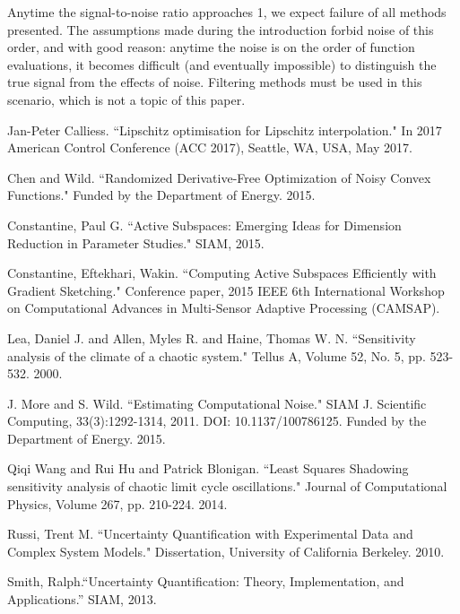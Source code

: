 \documentclass{amsart}
\begin{document}
Anytime the signal-to-noise ratio approaches 1, we expect failure of all methods presented. The assumptions made during the introduction forbid noise of this order, and with good reason: anytime the noise is on the order of function evaluations, it becomes difficult (and eventually impossible) to distinguish the true signal from the effects of noise. Filtering methods must be used in this scenario, which is not a topic of this paper.





\begin{thebibliography}{65}


 Jan-Peter Calliess. ``Lipschitz optimisation for Lipschitz interpolation." In 2017 American Control Conference (ACC 2017), Seattle, WA, USA, May 2017.

 Chen and Wild. ``Randomized Derivative-Free Optimization of Noisy Convex Functions." Funded by the Department of Energy. 2015.

 Constantine, Paul G. ``Active Subspaces: Emerging Ideas for Dimension Reduction in Parameter Studies." SIAM, 2015.

 Constantine, Eftekhari, Wakin. ``Computing Active Subspaces Efficiently with Gradient Sketching." Conference paper, 2015 IEEE 6th International Workshop on Computational Advances in Multi-Sensor Adaptive Processing (CAMSAP).


 Lea, Daniel J. and Allen, Myles R. and Haine, Thomas W. N. ``Sensitivity analysis of the climate of a chaotic system." Tellus A, Volume 52, No. 5, pp. 523-532. 2000.

 J. More and S. Wild. ``Estimating Computational Noise." SIAM J. Scientific Computing, 33(3):1292-1314, 2011. DOI: 10.1137/100786125. Funded by the Department of Energy. 2015.


 Qiqi Wang and Rui Hu and Patrick Blonigan. ``Least Squares Shadowing sensitivity analysis of chaotic limit cycle oscillations." Journal of Computational Physics, Volume 267, pp. 210-224. 2014.

 Russi, Trent M. ``Uncertainty Quantification with Experimental Data and Complex System Models." Dissertation, University of California Berkeley. 2010.

  Smith, Ralph.``Uncertainty Quantification: Theory, Implementation, and Applications.” SIAM, 2013.




\end{thebibliography}
\end{document}
